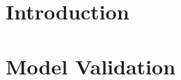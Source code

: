 \documentclass[12pt,twoside]{report}
\begin{document}

\thispagestyle{empty}



%

\tableofcontents

%






\chapter{Introduction}

\cleardoublepage

\chapter{Model Validation}

\cleardoublepage


%




\newpage


\end{document}
